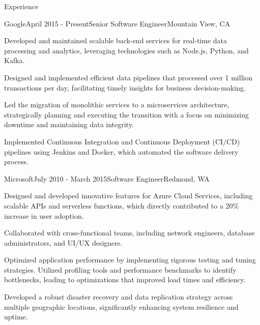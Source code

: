 \documentclass[
	11pt, %
]{resume} %
\begin{document}

\begin{rSection}{Experience}

	\begin{rSubsection}{Google}{April 2015 - Present}{Senior Software Engineer}{Mountain View, CA}
		\item Developed and maintained scalable back-end services for real-time data processing and analytics, leveraging technologies such as Node.js, Python, and Kafka. 
		\item Designed and implemented efficient data pipelines that processed over 1 million transactions per day, facilitating timely insights for business decision-making.
		\item Led the migration of monolithic services to a microservices architecture, strategically planning and executing the transition with a focus on minimizing downtime and maintaining data integrity.
		\item Implemented Continuous Integration and Continuous Deployment (CI/CD) pipelines using Jenkins and Docker, which automated the software delivery process. 
	\end{rSubsection}

	\begin{rSubsection}{Microsoft}{July 2010 - March 2015}{Software Engineer}{Redmond, WA}
		\item Designed and developed innovative features for Azure Cloud Services, including scalable APIs and serverless functions, which directly contributed to a 20\% increase in user adoption. 
		\item Collaborated with cross-functional teams, including network engineers, database administrators, and UI/UX designers.
		\item Optimized application performance by implementing rigorous testing and tuning strategies. Utilized profiling tools and performance benchmarks to identify bottlenecks, leading to optimizations that improved load times and efficiency. 
		\item Developed a robust disaster recovery and data replication strategy across multiple geographic locations, significantly enhancing system resilience and uptime. 
	\end{rSubsection}


\end{rSection}
\end{document}
